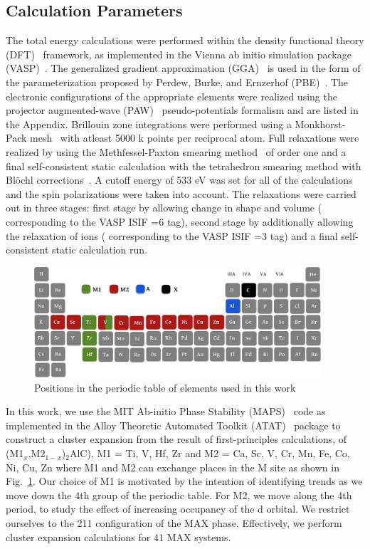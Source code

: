 \documentclass[preprint,amsmath,amssymb,aps, prb,showkeys]{revtex4-1}
\newcommand{\fig}[1]{Fig.~\ref{#1}}
\begin{document}
\subsection{Calculation Parameters}
The total energy calculations were performed within the density functional theory (DFT)~\cite{kohn1965self} framework, as implemented in the Vienna ab initio simulation package (VASP)~\cite{vasp,vasp2}. The generalized gradient approximation (GGA)~\cite{GGA} is used in the form
of the parameterization proposed by Perdew, Burke, and Ernzerhof (PBE)~\cite{perdew1996generalized,perdew1997generalized}. The electronic configurations of the appropriate elements were realized using the projector augmented-wave (PAW)~\cite{PAW} pseudo-potentials formalism and are listed in the Appendix. Brillouin zone integrations were performed using a Monkhorst-Pack mesh~\cite{monkpack} with atleast 5000 k points per reciprocal atom. Full relaxations were realized by using the Methfessel-Paxton smearing method~\cite{smearing} of order one and a final self-consistent static calculation with the tetrahedron smearing method with Bl{\"o}chl corrections~\cite{tetramethod}. A cutoff energy of 533 eV was set for all of the calculations and the spin polarizations were taken into account. The relaxations were carried out in three stages: first stage by allowing change in shape and volume ( corresponding to the VASP ISIF =6 tag), second stage by additionally allowing the relaxation of ions ( corresponding to the 
VASP ISIF =3 tag) and a final self-consistent static calculation run.


\begin{figure}
\centering
\includegraphics[width=0.95\textwidth]{figure_2}
\caption{Positions in the periodic table of elements used in this work}
\label{fig:SS_periodic_table}
\end{figure}

In this work, we use the MIT Ab-initio Phase Stability (MAPS)~\cite{van2002automating} code as implemented in the Alloy Theoretic Automated Toolkit (ATAT)~\cite{vanderwalleATAT} package to construct a cluster expansion from the result of first-principles calculations, of (M1$_x$,M2$_{1-x}$)$_2$AlC), M1 = Ti, V, Hf, Zr and M2 = Ca, Sc, V, Cr, Mn, Fe, Co, Ni, Cu, Zn where M1 and M2 can exchange places in the M site as shown in \fig{fig:SS_periodic_table}. Our choice of M1 is motivated by the intention of identifying trends as we move down the 4th group of the periodic table. For M2, we move along the 4th period, to study the effect of increasing occupancy of the d orbital. We restrict ourselves to the 211 configuration of the MAX phase. Effectively, we perform cluster expansion calculations for 41 MAX systems. 
\end{document}
